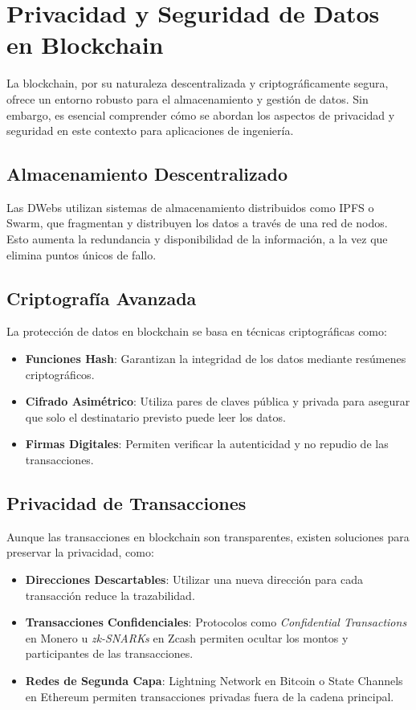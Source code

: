 \section{Privacidad y Seguridad de Datos en Blockchain}

La blockchain, por su naturaleza descentralizada y criptográficamente segura, ofrece un entorno robusto para el almacenamiento y gestión de datos. Sin embargo, es esencial comprender cómo se abordan los aspectos de privacidad y seguridad en este contexto para aplicaciones de ingeniería.

\subsection{Almacenamiento Descentralizado}

Las DWebs utilizan sistemas de almacenamiento distribuidos como IPFS o Swarm, que fragmentan y distribuyen los datos a través de una red de nodos. Esto aumenta la redundancia y disponibilidad de la información, a la vez que elimina puntos únicos de fallo.

\subsection{Criptografía Avanzada}

La protección de datos en blockchain se basa en técnicas criptográficas como:

\begin{itemize}
    \item \textbf{Funciones Hash}: Garantizan la integridad de los datos mediante resúmenes criptográficos.
    \item \textbf{Cifrado Asimétrico}: Utiliza pares de claves pública y privada para asegurar que solo el destinatario previsto puede leer los datos.
    \item \textbf{Firmas Digitales}: Permiten verificar la autenticidad y no repudio de las transacciones.
\end{itemize}

\subsection{Privacidad de Transacciones}

Aunque las transacciones en blockchain son transparentes, existen soluciones para preservar la privacidad, como:

\begin{itemize}
    \item \textbf{Direcciones Descartables}: Utilizar una nueva dirección para cada transacción reduce la trazabilidad.
    \item \textbf{Transacciones Confidenciales}: Protocolos como \textit{Confidential Transactions} en Monero u \textit{zk-SNARKs} en Zcash permiten ocultar los montos y participantes de las transacciones.
    \item \textbf{Redes de Segunda Capa}: Lightning Network en Bitcoin o State Channels en Ethereum permiten transacciones privadas fuera de la cadena principal.
\end{itemize}

